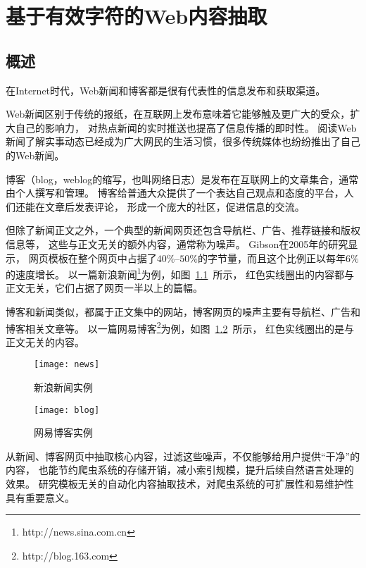 
\chapter{基于有效字符的Web内容抽取}

\section{概述}
\label{sec:cevc-intro}
在Internet时代，Web新闻和博客都是很有代表性的信息发布和获取渠道。

Web新闻区别于传统的报纸，在互联网上发布意味着它能够触及更广大的受众，扩大自己的影响力，
对热点新闻的实时推送也提高了信息传播的即时性。
阅读Web新闻了解实事动态已经成为广大网民的生活习惯，很多传统媒体也纷纷推出了自己的Web新闻。

博客（blog，weblog的缩写，也叫网络日志）是发布在互联网上的文章集合，通常由个人撰写和管理。
博客给普通大众提供了一个表达自己观点和态度的平台，人们还能在文章后发表评论，
形成一个庞大的社区，促进信息的交流。

但除了新闻正文之外，一个典型的新闻网页还包含导航栏、广告、推荐链接和版权信息等，
这些与正文无关的额外内容，通常称为噪声。
Gibson在2005年的研究\cite{gibson2005volume}显示，
网页模板在整个网页中占据了$40\%$--$50\%$的字节量，而且这个比例正以每年$6\%$的速度增长。
以一篇新浪新闻\footnote{http://news.sina.com.cn}为例，如图~\ref{fig:news}~所示，
红色实线圈出的内容都与正文无关，它们占据了网页一半以上的篇幅。

博客和新闻类似，都属于正文集中的网站，博客网页的噪声主要有导航栏、广告和博客相关文章等。
以一篇网易博客\footnote{http://blog.163.com}为例，如图~\ref{fig:blog}~所示，
红色实线圈出的是与正文无关的内容。

\begin{figure}[htbp]
\centering
\texttt{[image: news]}
\caption{新浪新闻实例}
\label{fig:news}
\end{figure}

\begin{figure}[htbp]
\centering
\texttt{[image: blog]}
\caption{网易博客实例}
\label{fig:blog}
\end{figure}

从新闻、博客网页中抽取核心内容，过滤这些噪声，不仅能够给用户提供“干净”的内容，
也能节约爬虫系统的存储开销，减小索引规模，提升后续自然语言处理的效果。
研究模板无关的自动化内容抽取技术，对爬虫系统的可扩展性和易维护性具有重要意义。

